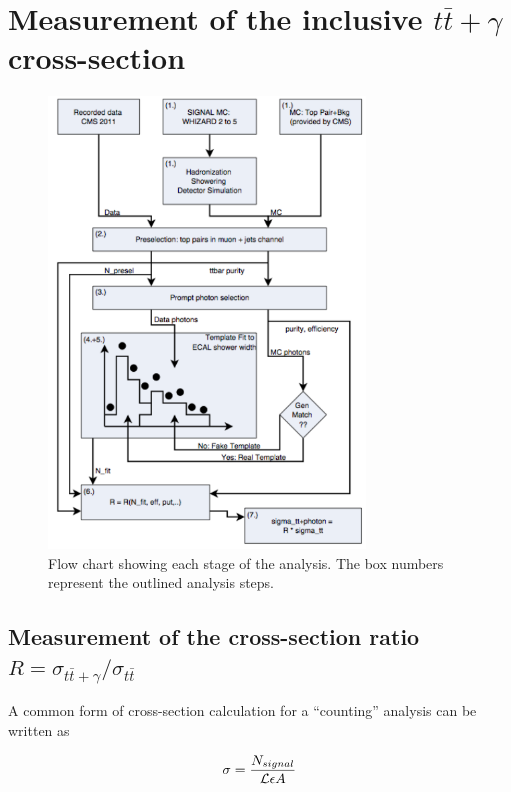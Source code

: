 \chapter{Measurement of the inclusive $t\bar{t}+\gamma$ cross-section}\label{chap-crosssection}

\begin{figure}
\begin{center}
\includegraphics[width=0.75\textwidth]{Figures/AnalysisFlowChart.png}
\end{center}
\caption{Flow chart showing each stage of the analysis. The box numbers represent the outlined
analysis steps.}
\label{fig-AnalysisFlowChart}
\end{figure}

\section{Measurement of the cross-section ratio $R = \sigma_{t\bar{t}+\gamma}/\sigma_{t\bar{t}}$}

A common form of cross-section calculation for a ``counting'' analysis can be written as

\begin{equation} \label{eqn-CountingXsect}
\sigma = \frac{N_{signal}}{\mathcal{L} \epsilon A}
\end{equation}

